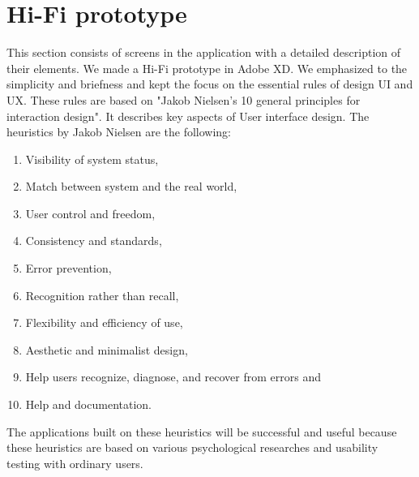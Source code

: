 \section{Hi-Fi prototype}\label{sec:hi-fi-prototype}
This section consists of screens in the application with a detailed description of their elements.
We made a Hi-Fi prototype in Adobe XD.
We emphasized to the simplicity and briefness and kept the focus on the essential rules of design UI and UX.
These rules are based on "Jakob Nielsen's 10 general principles for interaction design".\cite{nnGroup}
It describes key aspects of User interface design.
The heuristics by Jakob Nielsen are the following:
\begin{enumerate}
    \item Visibility of system status,
    \item Match between system and the real world,
    \item User control and freedom,
    \item Consistency and standards,
    \item Error prevention,
    \item Recognition rather than recall,
    \item Flexibility and efficiency of use,
    \item Aesthetic and minimalist design,
    \item Help users recognize, diagnose, and recover from errors and
    \item Help and documentation.\cite{nnGroup}
\end{enumerate}

The applications built on these heuristics will be successful and useful because these heuristics are based on various psychological researches and usability testing with ordinary users.














